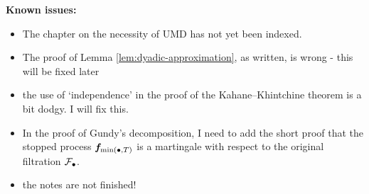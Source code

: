 \textbf{Known issues:}
\begin{itemize}
\item The chapter on the necessity of UMD has not yet been indexed.
\item The proof of Lemma \ref{lem:dyadic-approximation}, as written, is wrong - this will be fixed later
\item the use of `independence' in the proof of the Kahane--Khintchine theorem is a bit dodgy. I will fix this.
\item In the proof of Gundy's decomposition, I need to add the short proof that the stopped process $\bm{f}_{\min(\bullet, T)}$ is a martingale with respect to the original filtration $\mathcal{F}_{\bullet}$.
\item the notes are not finished!
\end{itemize}

  





